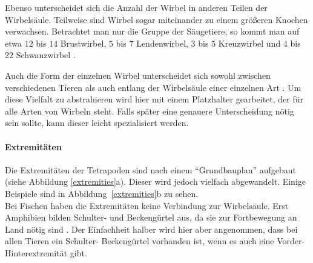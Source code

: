 Ebenso unterscheidet sich die Anzahl der Wirbel in anderen Teilen der Wirbelsäule. Teilweise sind Wirbel sogar miteinander zu einem größeren Knochen verwachsen. Betrachtet man nur die Gruppe der Säugetiere, so kommt man auf etwa $12$ bis $14$ Brustwirbel, $5$ bis $7$ Lendenwirbel, $3$ bis $5$ Kreuzwirbel und $4$ bis $22$ Schwanzwirbel \cite{AnatomieKuenstler}.

Auch die Form der einzelnen Wirbel unterscheidet sich sowohl zwischen verschiedenen Tieren als auch entlang der Wirbelsäule einer einzelnen Art \cite[Abschnitt 9.1 und Abbildung~9.2]{Vergleichende_Anatomie}. 
Um diese Vielfalt zu abstrahieren wird hier mit einem Platzhalter gearbeitet, der für alle Arten von Wirbeln steht. Falls später eine genauere Unterscheidung nötig sein sollte, kann dieser leicht spezialisiert werden.

\paragraph{Extremitäten}
Die Extremitäten der Tetrapoden sind nach einem "`Grundbauplan"' aufgebaut (siehe Abbildung \ref{extremities}a). Dieser wird jedoch vielfach abgewandelt. Einige Beispiele sind in Abbildung~\ref{extremities}b zu sehen. \cite[S.\ 487]{AllgemeineZoologie}\\
Bei Fischen haben die Extremitäten keine Verbindung zur Wirbelsäule. Erst Amphibien bilden Schulter- und Beckengürtel aus, da sie zur Fortbewegung an Land nötig sind \cite[Abschnitt 9.2.3]{Vergleichende_Anatomie}.
Der Einfachheit halber wird hier aber angenommen, dass bei allen Tieren ein Schulter- \bzw Beckengürtel vorhanden ist, wenn es auch eine Vorder- \bzw Hinterextremität gibt.

